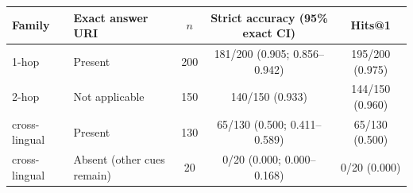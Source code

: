 \begin{tabular}{llccc}
\toprule
Family & Exact answer URI & $n$ & Strict accuracy (95\% exact CI) & Hits@1 \\
\midrule
1-hop & Present & 200 & 181/200 (0.905; 0.856--0.942) & 195/200 (0.975) \\
2-hop & Not applicable & 150 & 140/150 (0.933) & 144/150 (0.960) \\
cross-lingual & Present & 130 & 65/130 (0.500; 0.411--0.589) & 65/130 (0.500) \\
cross-lingual & Absent (other cues remain) & 20 & 0/20 (0.000; 0.000--0.168) & 0/20 (0.000) \\
\bottomrule
\end{tabular}
